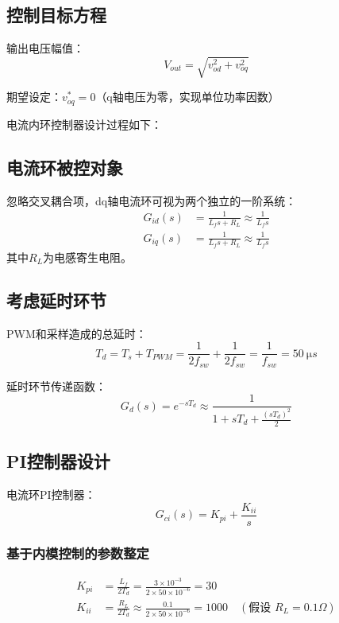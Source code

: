 \documentclass[11pt,a4paper]{article}
\begin{document}
\subsection{控制目标方程}
输出电压幅值：
\begin{equation}
V_{out} = \sqrt{v_{od}^2 + v_{oq}^2}
\end{equation}

期望设定：$v_{oq}^* = 0$（q轴电压为零，实现单位功率因数）

电流内环控制器设计过程如下：

\subsection{电流环被控对象}
忽略交叉耦合项，dq轴电流环可视为两个独立的一阶系统：
\begin{align}
G_{id}(s) &= \frac{1}{L_f s + R_L} \approx \frac{1}{L_f s} \\
G_{iq}(s) &= \frac{1}{L_f s + R_L} \approx \frac{1}{L_f s}
\end{align}
其中$R_L$为电感寄生电阻。

\subsection{考虑延时环节}
PWM和采样造成的总延时：
\begin{equation}
T_d = T_s + T_{PWM} = \frac{1}{2f_{sw}} + \frac{1}{2f_{sw}} = \frac{1}{f_{sw}} = \SI{50}{\micro s}
\end{equation}

延时环节传递函数：
\begin{equation}
G_d(s) = e^{-sT_d} \approx \frac{1}{1 + sT_d + \frac{(sT_d)^2}{2}}
\end{equation}

\subsection{PI控制器设计}
电流环PI控制器：
\begin{equation}
G_{ci}(s) = K_{pi} + \frac{K_{ii}}{s}
\end{equation}

\subsubsection{基于内模控制的参数整定}
\begin{align}
K_{pi} &= \frac{L_f}{2T_d} = \frac{3\times10^{-3}}{2\times50\times10^{-6}} = 30 \\
K_{ii} &= \frac{R_L}{2T_d} \approx \frac{0.1}{2\times50\times10^{-6}} = 1000 \quad (\text{假设 } R_L = {0.1}{\Omega})
\end{align}
\end{document}
